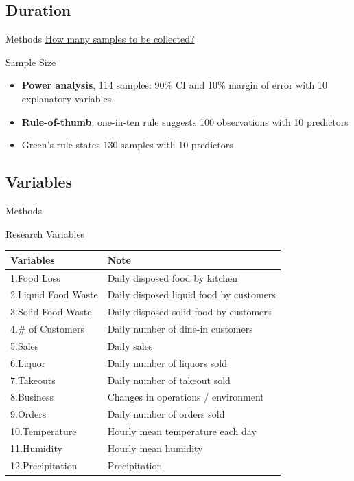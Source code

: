 \documentclass{beamer}
\begin{document}
\subsection{Duration}
\begin{frame}{Methods}
    \underline{How many samples to be collected?}
    \begin{block}{Sample Size}
        \begin{itemize}
            \item \textbf{Power analysis}, 
            114 samples: 90\% CI and 10\% margin of error with 10 explanatory variables.
            \item \textbf{Rule-of-thumb}, one-in-ten rule suggests 100 observations with 10 predictors\cite{Harrell1984-te}
            \item Green's rule states 130 samples with 10 predictors\cite{Green1991-aj}
        \end{itemize}
    \end{block}
\end{frame}

\subsection{Variables}
\begin{frame}{Methods}
    \begin{block}{Research Variables}
    \small
        \begin{tabular}{ll}
            \hline
            Variables & Note \\ \hline
            1.Food Loss & Daily disposed food by kitchen \\
            2.Liquid Food Waste & Daily disposed liquid food by customers \\
            3.Solid Food Waste & Daily disposed solid food by customers \\ \hline
            4.\# of Customers & Daily number of dine-in customers \\
            5.Sales & Daily sales \\
            6.Liquor & Daily number of liquors sold \\
            7.Takeouts & Daily number of takeout sold \\
            8.Business & Changes in operations / environment\\
            \vspace{0.5em}
            9.Orders & Daily number of orders sold \\
            10.Temperature & Hourly mean temperature each day \\
            11.Humidity & Hourly mean humidity \\
            12.Precipitation & Precipitation \\ \hline
        \end{tabular}
    \end{block}
\end{frame}
\end{document}
